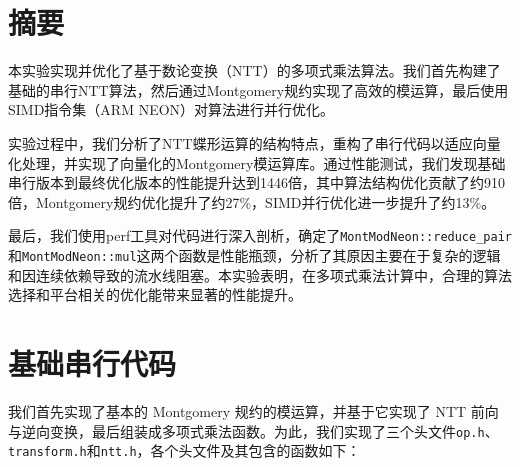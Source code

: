 \documentclass[a4paper]{article}
\begin{document}
\section{摘要}

本实验实现并优化了基于数论变换（NTT）的多项式乘法算法。我们首先构建了基础的串行NTT算法，然后通过Montgomery规约实现了高效的模运算，最后使用SIMD指令集（ARM NEON）对算法进行并行优化。

实验过程中，我们分析了NTT蝶形运算的结构特点，重构了串行代码以适应向量化处理，并实现了向量化的Montgomery模运算库。通过性能测试，我们发现基础串行版本到最终优化版本的性能提升达到1446倍，其中算法结构优化贡献了约910倍，Montgomery规约优化提升了约27\%，SIMD并行优化进一步提升了约13\%。

最后，我们使用perf工具对代码进行深入剖析，确定了\texttt{MontModNeon::reduce\_pair}和\texttt{MontModNeon::mul}这两个函数是性能瓶颈，分析了其原因主要在于复杂的逻辑和因连续依赖导致的流水线阻塞。本实验表明，在多项式乘法计算中，合理的算法选择和平台相关的优化能带来显著的性能提升。

\section{基础串行代码}

我们首先实现了基本的 Montgomery 规约的模运算，并基于它实现了 NTT 前向与逆向变换，最后组装成多项式乘法函数。为此，我们实现了三个头文件\texttt{op.h}、\texttt{transform.h}和\texttt{ntt.h}，各个头文件及其包含的函数如下：
\end{document}
